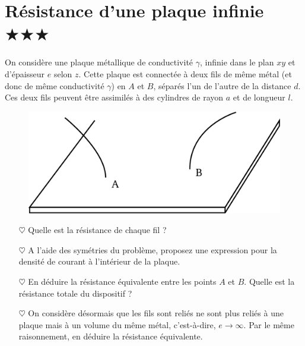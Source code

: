 \documentclass{report}
\begin{document}
\newpage

\section*{Résistance d'une plaque infinie $\bigstar\bigstar\bigstar$}

On considère une plaque métallique de conductivité $\gamma$, infinie dans le plan $xy$ et d'épaisseur $e$ selon $z$. Cette plaque est connectée à deux fils de même métal (et donc de même conductivité $\gamma$) en $A$ et $B$, séparés l'un de l'autre de la distance $d$. Ces deux fils peuvent être assimilés à des cylindres de rayon $a$ et de longueur $l$. 

\begin{figure}[h!]
\centering
		\includegraphics[scale=0.3]{plaque.pdf}
\end{figure}

\begin{itemize}

	\item[$\heartsuit$] Quelle est la résistance de chaque fil ? 
	
	\item[$\heartsuit$] A l'aide des symétries du problème, proposez une expression pour la densité de courant à l'intérieur de la plaque. 
	
	\item[$\heartsuit$] En déduire la résistance équivalente entre les points $A$ et $B$. Quelle est la résistance totale du dispositif ?
	
	\item[$\heartsuit$] On considère désormais que les fils sont reliés ne sont plus reliés à une plaque mais à un volume du même métal, c'est-à-dire, $e\longrightarrow\infty$. Par le même raisonnement, en déduire la résistance équivalente. 

\end{itemize}

\newpage
\end{document}

